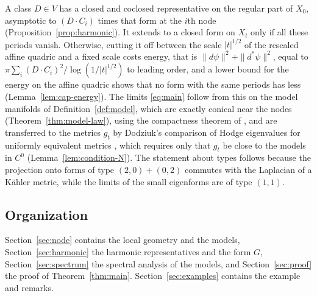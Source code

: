 A class $D\in V$ has a closed and coclosed representative on the regular
part of $X_0$, asymptotic to $(D\cdot C_i)$ times that form at the
$i$th node (Proposition~\ref{prop:harmonic}). It extends to a closed
form on $X_t$ only if all these periods vanish. Otherwise, cutting it
off between the scale $|t|^{1/2}$ of the rescaled affine quadric and a
fixed scale costs energy, that is $\|d\psi\|^2+\|d^*\psi\|^2$, equal to
$\pi\sum_i(D\cdot C_i)^2/\log(1/|t|^{1/2})$ to leading order, and a lower bound for the energy on the affine quadric shows that no form with the same periods
has less (Lemma~\ref{lem:cap-energy}). The limits \eqref{eq:main} follow
from this on the model manifolds of Definition~\ref{def:model}, which
are exactly conical near the nodes (Theorem~\ref{thm:model-law}), using the compactness theorem of
\cite{anne-takahashi}, and are transferred to the metrics $g_t$ by
Dodziuk's comparison of Hodge eigenvalues for uniformly equivalent
metrics \cite{dodziuk}, which requires only that $g_t$ be close to the
models in $C^0$ (Lemma~\ref{lem:condition-N}). The statement about types
follows because the projection onto forms of type $(2,0)+(0,2)$ commutes
with the Laplacian of a K\"ahler metric, while the limits of the small
eigenforms are of type $(1,1)$.

\subsection{Organization}
Section~\ref{sec:node} contains the local geometry and the models,
Section~\ref{sec:harmonic} the harmonic representatives and the form $G$,
Section~\ref{sec:spectrum} the spectral analysis of the models, and
Section~\ref{sec:proof} the proof of Theorem~\ref{thm:main}.
Section~\ref{sec:examples} contains the example and remarks.
